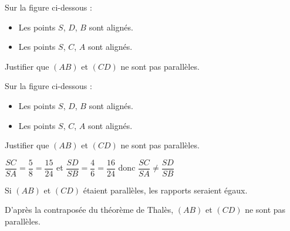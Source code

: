 \begin{exercice*} 
    Sur la figure ci-dessous :
    \begin{itemize}
        \item Les points $S$, $D$, $B$ sont alignés.
        \item Les points $S$, $C$, $A$ sont alignés.
    \end{itemize}

    Justifier que $(AB)$ et $(CD)$ ne sont pas parallèles.
\end{exercice*}
\begin{corrige}
    Sur la figure ci-dessous :
    \begin{itemize}
        \item Les points $S$, $D$, $B$ sont alignés.
        \item Les points $S$, $C$, $A$ sont alignés.
    \end{itemize}

    Justifier que $(AB)$ et $(CD)$ ne sont pas parallèles. 
    
    \smallskip
    {\color{red} $\dfrac{SC}{SA}=\dfrac{5}{8}=\dfrac{15}{24}$ et $\dfrac{SD}{SB}=\dfrac{4}{6}=\dfrac{16}{24}$ donc $\dfrac{SC}{SA}\neq \dfrac{SD}{SB}$
    
    \smallskip
    Si $(AB)$ et $(CD)$ étaient parallèles, les rapports seraient égaux.

    D'après la contraposée du théorème de Thalès, $(AB)$ et $(CD)$ ne sont pas parallèles.
    }

\end{corrige}

